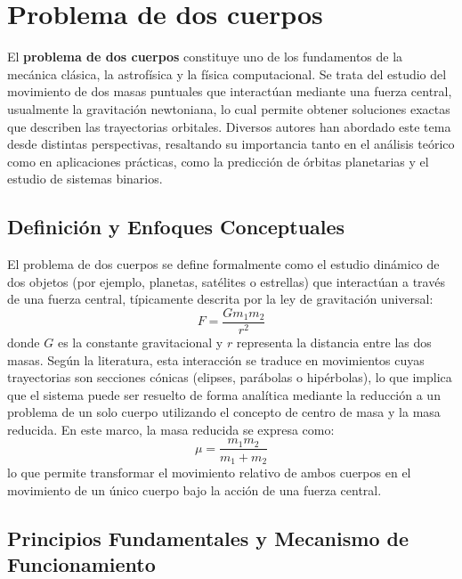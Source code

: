 \section{Problema de dos cuerpos}\label{sec:two-body_problem}

El \textbf{problema de dos cuerpos} constituye uno de los fundamentos de la mecánica clásica, la astrofísica y la física computacional. Se trata del estudio del movimiento de dos masas puntuales que interactúan mediante una fuerza central, usualmente la gravitación newtoniana, lo cual permite obtener soluciones exactas que describen las trayectorias orbitales. Diversos autores han abordado este tema desde distintas perspectivas, resaltando su importancia tanto en el análisis teórico como en aplicaciones prácticas, como la predicción de órbitas planetarias y el estudio de sistemas binarios. %

\subsection{Definición y Enfoques Conceptuales}

El problema de dos cuerpos se define formalmente como el estudio dinámico de dos objetos (por ejemplo, planetas, satélites o estrellas) que interactúan a través de una fuerza central, típicamente descrita por la ley de gravitación universal:
\begin{equation}
    F = \frac{G m_1 m_2}{r^2}
\end{equation}
donde \(G\) es la constante gravitacional y \(r\) representa la distancia entre las dos masas. Según la literatura, esta interacción se traduce en movimientos cuyas trayectorias son secciones cónicas (elipses, parábolas o hipérbolas), lo que implica que el sistema puede ser resuelto de forma analítica mediante la reducción a un problema de un solo cuerpo utilizando el concepto de centro de masa y la masa reducida. En este marco, la masa reducida se expresa como: %
\begin{equation}
    \mu = \frac{m_1 m_2}{m_1 + m_2}
\end{equation}
lo que permite transformar el movimiento relativo de ambos cuerpos en el movimiento de un único cuerpo bajo la acción de una fuerza central.

\subsection{Principios Fundamentales y Mecanismo de Funcionamiento}

